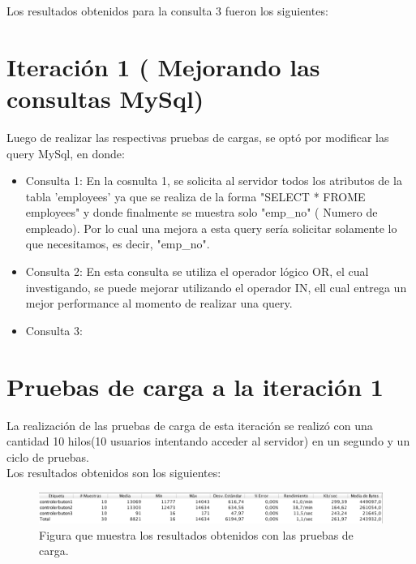 Los resultados obtenidos para la consulta 3 fueron los siguientes: 
 
\section{Iteración 1 ( Mejorando las consultas MySql)} 

Luego de realizar las respectivas pruebas de cargas, se optó por modificar las query MySql, en donde: 


\begin{itemize}
	\item Consulta 1: En la cosnulta 1, se solicita al servidor todos los atributos de la tabla 'employees' ya que se realiza de la forma "SELECT * FROME employees" y donde finalmente se muestra solo "emp\_no" ( Numero de empleado). Por lo cual una mejora a esta query sería solicitar solamente lo que necesitamos, es decir, "emp\_no".\\
	
	\item Consulta 2: En esta consulta se utiliza el operador lógico OR, el cual investigando, se puede mejorar utilizando el operador IN, ell cual entrega un mejor performance al momento de realizar una query.\\
	
	\item Consulta 3: 
\end{itemize}

\section{Pruebas de carga a la iteración 1}

La realización de las pruebas de carga de esta iteración se realizó con una cantidad 10 hilos(10 usuarios intentando acceder al servidor)
en un segundo y un ciclo de pruebas.\\

Los resultados obtenidos son los siguientes:

\begin{figure}[htb]
	\label{Figura10}
	\begin{center}
		\includegraphics[scale=0.7]{imagenes/iteracion0-maneravieja.png}
		\caption{Figura que muestra los resultados obtenidos con las pruebas de carga.}
	\end{center}
\end{figure}


